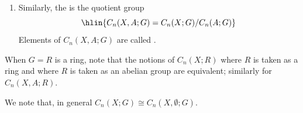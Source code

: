 \begin{definition}
\begin{enumerate}
\begin{enumerate}
        \item Similarly, the  is the quotient group
        $$\hlin{C_n(X,A;G) = C_n(X;G) / C_n(A;G)}$$
        Elements of $C_n(X,A;G)$ are called .
    \end{enumerate}
    When $G = R$ is a ring, note that the notions of $C_n(X;R)$ where $R$ is taken as a ring and where $R$ is taken as an abelian group are equivalent; similarly for $C_n(X,A;R)$.
    \end{enumerate}

    We note that, in general $C_n(X;G) \cong C_n(X, \emptyset; G)$. 

\end{definition}